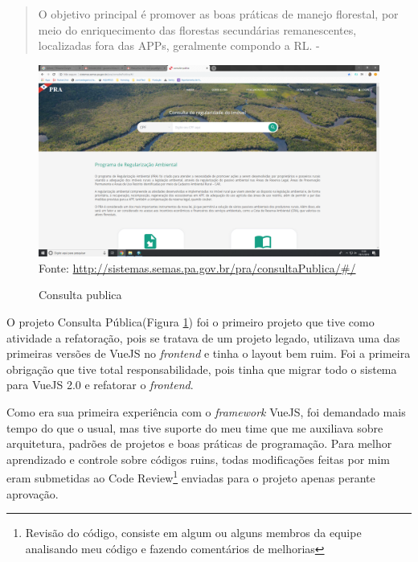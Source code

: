 \begin{quote}
    O objetivo principal é promover as boas
    práticas de manejo florestal, por meio do enriquecimento das florestas secundárias
    remanescentes, localizadas fora das APPs, geralmente compondo a RL. - \cite{de2015cadastro}
\end{quote}
\begin{figure}[H]
\centering
\caption{Consulta publica} %
\includegraphics[scale=0.22]{consulta-publica}\\  %
{\small Fonte: \url{http://sistemas.semas.pa.gov.br/pra/consultaPublica/#/}} %
\label{fig:consultaPublica} %
\end{figure}

O projeto Consulta Pública(Figura \ref{fig:consultaPublica}) foi o primeiro projeto que tive como atividade a refatoração, pois se tratava de um projeto legado, utilizava uma das primeiras versões de VueJS no \textit{frontend} e tinha o layout bem ruim.
Foi a primeira obrigação que tive total responsabilidade, pois tinha que migrar todo o sistema para VueJS 2.0 e refatorar o \textit{frontend}.

Como era sua primeira experiência com o \textit{framework} VueJS, foi demandado mais tempo do que o usual, mas tive suporte do meu time que me auxiliava sobre arquitetura, padrões de projetos e boas práticas de programação.
Para melhor aprendizado e controle sobre códigos ruins, todas modificações feitas por mim eram submetidas ao Code Review\footnote{Revisão do código, consiste em algum ou alguns membros da equipe analisando meu código e fazendo comentários de melhorias} enviadas para o projeto apenas perante aprovação. 

